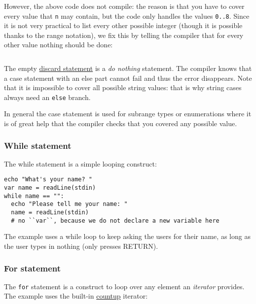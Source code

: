 However, the above code does not compile: the reason is that you have to
cover every value that \texttt{n} may contain, but the code only handles
the values \texttt{0..8}. Since it is not very practical to list every
other possible integer (though it is possible thanks to the range
notation), we fix this by telling the compiler that for every other
value nothing should be done:

\begin{verbatim}
\end{verbatim}

The empty \protect\hyperlink{procedures-discard-statement}{discard
statement} is a \emph{do nothing} statement. The compiler knows that a
case statement with an else part cannot fail and thus the error
disappears. Note that it is impossible to cover all possible string
values: that is why string cases always need an \texttt{else} branch.

In general the case statement is used for subrange types or enumerations
where it is of great help that the compiler checks that you covered any
possible value.

\hypertarget{while-statement}{%
\subsubsection{While statement}\label{while-statement}}

The while statement is a simple looping construct:

\begin{verbatim}
echo "What's your name? "
var name = readLine(stdin)
while name == "":
  echo "Please tell me your name: "
  name = readLine(stdin)
  # no ``var``, because we do not declare a new variable here
\end{verbatim}

The example uses a while loop to keep asking the users for their name,
as long as the user types in nothing (only presses RETURN).

\hypertarget{for-statement}{%
\subsubsection{For statement}\label{for-statement}}

The \texttt{for} statement is a construct to loop over any element an
\emph{iterator} provides. The example uses the built-in
\href{system.html\#countup.i,T,T,Positive}{countup} iterator:

\begin{verbatim}
\end{verbatim}

